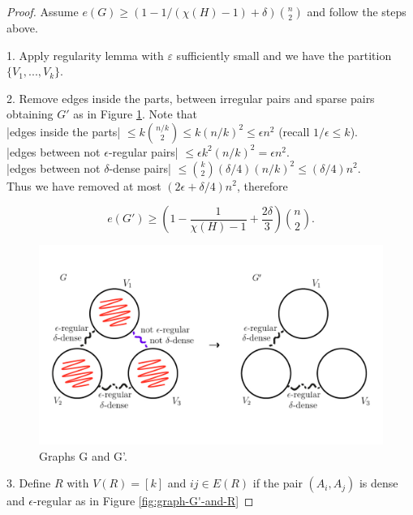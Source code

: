 \documentclass[12pt,twoside,a4paper]{book}
\numberwithin{equation}{section}
\theoremstyle{remark}
\begin{document}
\begin{proof}


Assume $e(G) \geq (1 - 1/(\chi(H) - 1) + \delta)\binom{n}{2}$ and follow the steps above.

1. Apply regularity lemma with $\varepsilon$ sufficiently small and we have the partition $\{V_1, ... , V_k\}$.

2. Remove edges inside the parts, between irregular pairs and sparse pairs obtaining $G'$ as in Figure \ref{fig:graph-G-and-G'}.
Note that\\

|edges inside the parts| $\leq k\binom{n/k}{2} \leq k(n/k)^2 \leq \epsilon n^2$ (recall $1/\epsilon \leq k$).\\

|edges between not $\epsilon$-regular pairs| $\leq \epsilon k^2 (n/k)^2 = \epsilon n^2$.\\

|edges between not $\delta$-dense pairs| $\leq \binom{k}{2}(\delta/4) (n/k)^2 \leq (\delta /4)n^2$.\\ 

Thus we have removed at most $(2\epsilon + \delta/4)n^2$, therefore 

$$ e(G') \geq  \left( 1 - \frac{1}{\chi(H) - 1} + \frac{2 \delta}{3}\right) \binom{n}{2}.$$

\begin{figure}[H]
     \centering
     \includegraphics[scale=1.5]{Figuras/graph-G-and-G'.jpg}
     \caption{Graphs G and G'.}
     \label{fig:graph-G-and-G'}
\end{figure}

3. Define $R$ with $V(R) = [k]$ and $ij \in E(R) $ if  the pair $(A_i, A_j)$ is dense and $\epsilon$-regular as in Figure \ref{fig:graph-G'-and-R}


\end{proof}
\end{document}
